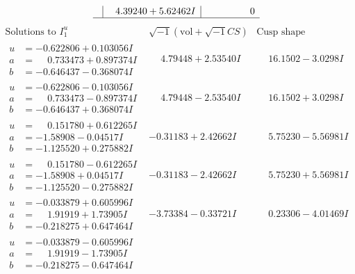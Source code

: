 \documentclass[1p]{elsarticle_modified}
\theoremstyle{definition}
\newcommand{\I}{\sqrt{-1}}
\begin{document}
$$\begin{array}{c|c|c}
 & \phantom{-}4.39240 + 5.62462 I & \phantom{-0.000000 } 0\\
 \hline 
 \end{array}$$\newpage$$\begin{array}{c|c|c}  
\text{Solutions to }I^u_{1}& \I (\text{vol} + \sqrt{-1}CS) & \text{Cusp shape}\\
 \hline 
\begin{aligned}
u &= -0.622806 + 0.103056 I \\
a &= \phantom{-}0.733473 + 0.897374 I \\
b &= -0.646437 - 0.368074 I\end{aligned}
 & \phantom{-}4.79448 + 2.53540 I & \phantom{-}16.1502 - 3.0298 I \\ \hline\begin{aligned}
u &= -0.622806 - 0.103056 I \\
a &= \phantom{-}0.733473 - 0.897374 I \\
b &= -0.646437 + 0.368074 I\end{aligned}
 & \phantom{-}4.79448 - 2.53540 I & \phantom{-}16.1502 + 3.0298 I \\ \hline\begin{aligned}
u &= \phantom{-}0.151780 + 0.612265 I \\
a &= -1.58908 - 0.04517 I \\
b &= -1.125520 + 0.275882 I\end{aligned}
 & -0.31183 + 2.42662 I & \phantom{-}5.75230 - 5.56981 I \\ \hline\begin{aligned}
u &= \phantom{-}0.151780 - 0.612265 I \\
a &= -1.58908 + 0.04517 I \\
b &= -1.125520 - 0.275882 I\end{aligned}
 & -0.31183 - 2.42662 I & \phantom{-}5.75230 + 5.56981 I \\ \hline\begin{aligned}
u &= -0.033879 + 0.605996 I \\
a &= \phantom{-}1.91919 + 1.73905 I \\
b &= -0.218275 + 0.647464 I\end{aligned}
 & -3.73384 - 0.33721 I & \phantom{-}0.23306 - 4.01469 I \\ \hline\begin{aligned}
u &= -0.033879 - 0.605996 I \\
a &= \phantom{-}1.91919 - 1.73905 I \\
b &= -0.218275 - 0.647464 I\end{aligned}

\end{array}$$
\end{document}
